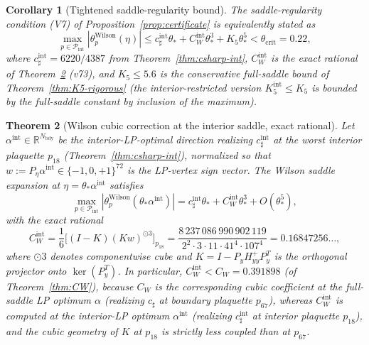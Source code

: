 \documentclass[11pt]{article}
\newtheorem{theorem}{Theorem}[section]
\newtheorem{corollary}[theorem]{Corollary}
\theoremstyle{definition}
\newcommand{\R}{\mathbb{R}}
\begin{document}
\begin{corollary}[Tightened saddle-regularity bound]\label{cor:V7-tightened}
The saddle-regularity condition \textup{(V7)} of
Proposition~\ref{prop:certificate} is equivalently stated as
\begin{equation}\label{eq:V7-int}
\max_{p\in\mathcal P_{\mathrm{int}}}|\theta_p^{\mathrm{Wilson}}(\eta)|
\le c_\sharp^{\mathrm{int}}\theta_*+C_W^{\mathrm{int}}\theta_*^3+K_5\theta_*^5
<\theta_{\mathrm{crit}}=0.22,
\end{equation}
where $c_\sharp^{\mathrm{int}}=6220/4387$ from
Theorem~\ref{thm:csharp-int}, $C_W^{\mathrm{int}}$ is the exact
rational of Theorem~\ref{thm:CW-int} (v73), and $K_5\le 5.6$ is the
conservative full-saddle bound of Theorem~\ref{thm:K5-rigorous}
\textup{(}the interior-restricted version $K_5^{\mathrm{int}}\le K_5$
is bounded by the full-saddle constant by inclusion of the
maximum\textup{)}.
\end{corollary}

\begin{theorem}[Wilson cubic correction at the interior saddle, exact rational]
\label{thm:CW-int}
Let $\alpha^{\mathrm{int}}\in\R^{N_{\mathrm{bdy}}}$ be the
interior-LP-optimal direction realizing $c_\sharp^{\mathrm{int}}$ at
the worst interior plaquette $p_{18}$ \textup{(}Theorem~\ref{thm:csharp-int}\textup{)}, normalized so that
$w:=P_\eta\alpha^{\mathrm{int}}\in\{-1,0,+1\}^{72}$ is the
LP-vertex sign vector.  The Wilson saddle expansion at $\eta=\theta_*\alpha^{\mathrm{int}}$
satisfies
\[
\max_{p\in\mathcal P_{\mathrm{int}}}|\theta_p^{\mathrm{Wilson}}(\theta_*\alpha^{\mathrm{int}})|
=c_\sharp^{\mathrm{int}}\theta_*+C_W^{\mathrm{int}}\theta_*^3+O(\theta_*^5),
\]
with the exact rational
\[
C_W^{\mathrm{int}}=\frac{1}{6}\bigl[(I-K)(Kw)^{\odot 3}\bigr]_{p_{18}}
=\frac{8\,237\,086\,990\,902\,119}{2^2\cdot 3\cdot 11\cdot 41^4\cdot 107^4}
=0.16847256\ldots,
\]
where $\odot 3$ denotes componentwise cube and $K=I-P_y H_{yy}^+ P_y^T$
is the orthogonal projector onto $\ker(P_y^T)$.  In particular,
$C_W^{\mathrm{int}}<C_W=0.391898$ \textup{(}of Theorem~\ref{thm:CW}\textup{)},
because $C_W$ is the corresponding cubic coefficient at the
\emph{full-saddle} LP optimum $\alpha$ \textup{(}realizing $c_\sharp$
at boundary plaquette $p_{67}$\textup{)}, whereas $C_W^{\mathrm{int}}$
is computed at the \emph{interior-LP} optimum $\alpha^{\mathrm{int}}$
\textup{(}realizing $c_\sharp^{\mathrm{int}}$ at interior plaquette
$p_{18}$\textup{)}, and the cubic geometry of $K$ at $p_{18}$ is
strictly less coupled than at $p_{67}$.
\end{theorem}
\end{document}
